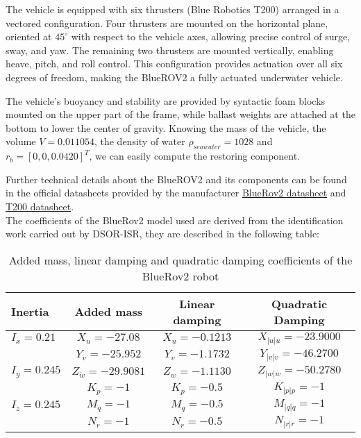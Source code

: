 The vehicle is equipped with six thrusters (Blue Robotics T200) arranged in a vectored configuration. Four thrusters are mounted on the horizontal plane, 
oriented at $45^\circ$ with respect to the vehicle axes, allowing precise control of surge, sway, and yaw. The remaining two thrusters are mounted vertically, enabling 
heave, pitch, and roll control. This configuration provides actuation over all six degrees of freedom, making the BlueROV2 a fully actuated underwater vehicle.

The vehicle's buoyancy and stability are provided by syntactic foam blocks mounted on the upper part of the frame, while ballast weights are attached at the bottom to 
lower the center of gravity. Knowing the mass of the vehicle, the volume $V = 0.011054$, the density of water $\rho_{seawater} = 1028$ and $r_b = [0, 0, 0.0420]^T$, 
we can easily compute the restoring component.

Further technical details about the BlueROV2 and its components can be found in the official datasheets provided by the manufacturer \href{https://bluerobotics.com/wp-content/uploads/2017/03/br_bluerov2_datasheet_rev3-bleed-dragged.pdf}{BlueRov2 datasheet} 
and \href{https://cdn.robotshop.com/media/b/blu/rb-blu-27/pdf/rb-blu-27_-_documentation.pdf}{T200 datasheet}.\\
The coefficients of the BlueRov2 model used are derived from the identification work carried out by DSOR-ISR, they are described in the following table:

\begin{table}[H]
    \centering
    \begin{tabular}{l c c c} \toprule
        {Inertia} & {Added mass} & {Linear damping} & {Quadratic Damping} \\ \midrule
        $I_x = 0.21$ & $X_{\dot{u}} = -27.08$ & $X_u = -0.1213$  & $X_{|u|u} = -23.9000$ \\
        { } & $Y_{\dot{v}} = -25.952$ & $Y_v = -1.1732$  & $Y_{|v|v} = -46.2700$ \\
        $I_y = 0.245$ & $Z_{\dot{w}} = -29.9081$ & $Z_w = -1.1130$  & $Z_{|w|w} = -50.2780$ \\
        { } & $K_{\dot{p}} = -1$ & $K_p = -0.5$  & $K_{|p|p} = -1$ \\
        $I_z = 0.245$ & $M_{\dot{q}} = -1$ & $M_q = -0.5$  & $M_{|q|q} = -1$ \\
        { } & $N_{\dot{r}} = -1$ & $N_r = -0.5$  & $N_{|r|r} = -1$ \\ \bottomrule
    \end{tabular}
    \caption{Added mass, linear damping and quadratic damping coefficients of the BlueRov2 robot}
    \label{tab:BlueRov_param}
\end{table}


